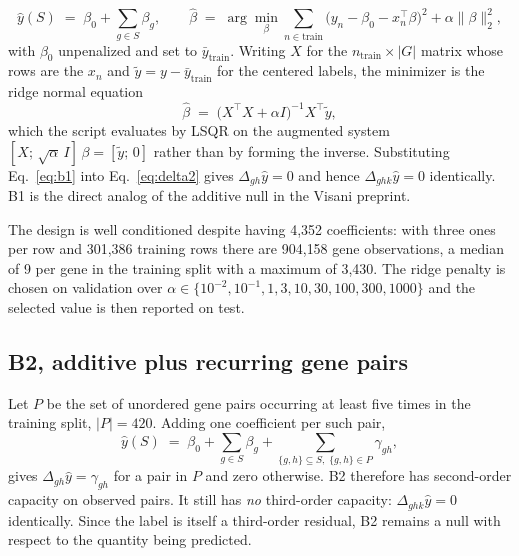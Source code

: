 %
\begin{equation}
  \hat{y}(S) \;=\; \beta_0 + \sum_{g \in S} \beta_g ,
  \qquad
  \hat{\beta} \;=\; \arg\min_{\beta} \sum_{n \in \mathrm{train}}
  \bigl(y_n - \beta_0 - x_n^{\top}\beta\bigr)^2 + \alpha \lVert \beta \rVert_2^2 ,
  \label{eq:b1}
\end{equation}
%
with $\beta_0$ unpenalized and set to $\bar{y}_{\mathrm{train}}$. Writing $X$ for
the $n_{\mathrm{train}} \times |G|$ matrix whose rows are the $x_n$ and
$\tilde{y} = y - \bar{y}_{\mathrm{train}}$ for the centered labels, the minimizer is
the ridge normal equation
%
\begin{equation}
  \hat{\beta} \;=\; \bigl(X^{\top} X + \alpha I\bigr)^{-1} X^{\top} \tilde{y} ,
  \label{eq:b1closed}
\end{equation}
%
which the script evaluates by LSQR on the augmented system
$[X;\, \sqrt{\alpha}\, I]\,\beta = [\tilde{y};\, 0]$ rather than by forming the
inverse. Substituting Eq.~\ref{eq:b1} into Eq.~\ref{eq:delta2} gives
$\Delta_{gh}\hat{y} = 0$ and hence $\Delta_{ghk}\hat{y} = 0$ identically. B1 is the
direct analog of the additive null in the Visani preprint.

The design is well conditioned despite having 4{,}352 coefficients: with three ones
per row and 301{,}386 training rows there are 904{,}158 gene observations, a median
of 9 per gene in the training split with a maximum of 3{,}430. The ridge penalty is
chosen on validation over
$\alpha \in \{10^{-2}, 10^{-1}, 1, 3, 10, 30, 100, 300, 1000\}$ and the selected
value is then reported on test.

\subsection{B2, additive plus recurring gene pairs}

Let $P$ be the set of unordered gene pairs occurring at least five times in the
training split, $|P| = 420$. Adding one coefficient per such pair,
%
\begin{equation}
  \hat{y}(S) \;=\; \beta_0 + \sum_{g \in S} \beta_g
  + \sum_{\{g,h\} \subseteq S,\; \{g,h\} \in P} \gamma_{gh} ,
  \label{eq:b2}
\end{equation}
%
gives $\Delta_{gh}\hat{y} = \gamma_{gh}$ for a pair in $P$ and zero otherwise. B2
therefore has second-order capacity on observed pairs. It still has \emph{no}
third-order capacity: $\Delta_{ghk}\hat{y} = 0$ identically. Since the label is
itself a third-order residual, B2 remains a null with respect to the quantity being
predicted.

